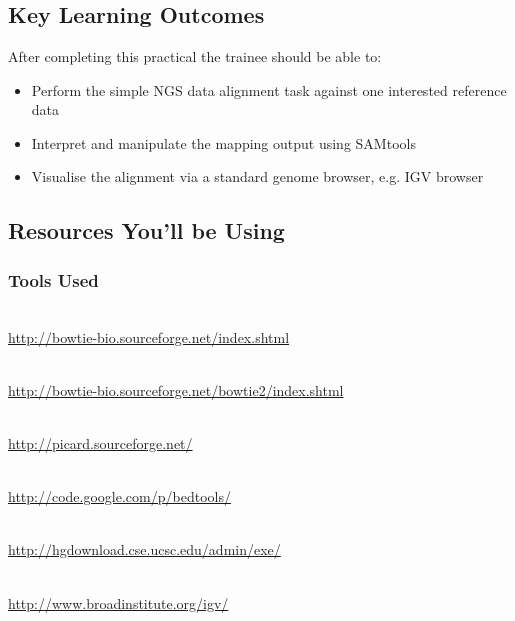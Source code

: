 
\chapter{\moduleTitle}
\newpage

\section{Key Learning Outcomes}

After completing this practical the trainee should be able to:
\begin{itemize}
  \item Perform the simple NGS data alignment task against one interested reference data
  \item Interpret and manipulate the mapping output using SAMtools
  \item Visualise the alignment via a standard genome browser, e.g. IGV browser
\end{itemize}

\section{Resources You'll be Using}
 
\subsection{Tools Used}
\begin{description}[style=multiline,labelindent=0cm,align=left,leftmargin=0.5cm]
  \item[Bowtie]\hfill\\
  	\url{http://bowtie-bio.sourceforge.net/index.shtml}
  \item[Bowtie 2]\hfill\\
  	\url{http://bowtie-bio.sourceforge.net/bowtie2/index.shtml}
  \item[Samtools]\hfill\\
  	\url{http://picard.sourceforge.net/}
  \item[BEDTools]\hfill\\
  	\url{http://code.google.com/p/bedtools/}
  \item[UCSC tools]\hfill\\
  	\url{http://hgdownload.cse.ucsc.edu/admin/exe/}  
  \item[IGV genome browser]\hfill\\
  	\url{http://www.broadinstitute.org/igv/}
\end{description}

